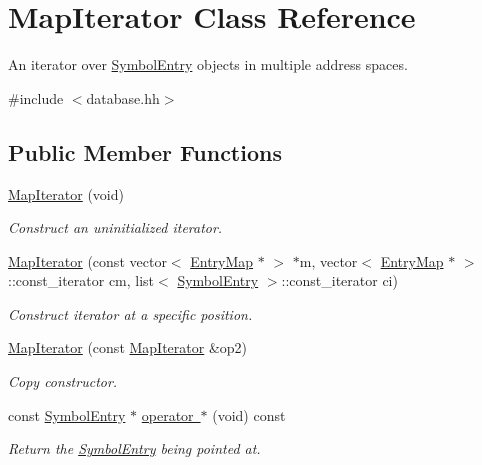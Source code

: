 \hypertarget{class_map_iterator}{}\section{Map\+Iterator Class Reference}
\label{class_map_iterator}


An iterator over \mbox{\hyperlink{class_symbol_entry}{Symbol\+Entry}} objects in multiple address spaces.  




{\ttfamily \#include $<$database.\+hh$>$}

\subsection*{Public Member Functions}
\begin{DoxyCompactItemize}
\item 
\mbox{\hyperlink{class_map_iterator_ab1bb98461c001151175f7df29f9f4287}{Map\+Iterator}} (void)
\begin{DoxyCompactList}\small\item\em Construct an uninitialized iterator. \end{DoxyCompactList}\item 
\mbox{\hyperlink{class_map_iterator_a20752a5cc471c1f0d927235a64e9de04}{Map\+Iterator}} (const vector$<$ \mbox{\hyperlink{database_8hh_a44a8ea0c0009b316b2651d374e5d4260}{Entry\+Map}} $\ast$ $>$ $\ast$m, vector$<$ \mbox{\hyperlink{database_8hh_a44a8ea0c0009b316b2651d374e5d4260}{Entry\+Map}} $\ast$ $>$\+::const\+\_\+iterator cm, list$<$ \mbox{\hyperlink{class_symbol_entry}{Symbol\+Entry}} $>$\+::const\+\_\+iterator ci)
\begin{DoxyCompactList}\small\item\em Construct iterator at a specific position. \end{DoxyCompactList}\item 
\mbox{\hyperlink{class_map_iterator_a7cd921245d4d9307a2bdca62c39abda5}{Map\+Iterator}} (const \mbox{\hyperlink{class_map_iterator}{Map\+Iterator}} \&op2)
\begin{DoxyCompactList}\small\item\em Copy constructor. \end{DoxyCompactList}\item 
const \mbox{\hyperlink{class_symbol_entry}{Symbol\+Entry}} $\ast$ \mbox{\hyperlink{class_map_iterator_a82d221d7ac1084d784b47e3732b39a03}{operator $\ast$}} (void) const
\begin{DoxyCompactList}\small\item\em Return the \mbox{\hyperlink{class_symbol_entry}{Symbol\+Entry}} being pointed at. \end{DoxyCompactList}\item 

\end{DoxyCompactItemize}
